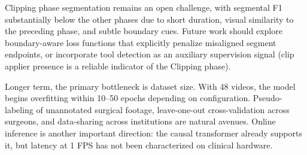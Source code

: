 \documentclass[10pt,twocolumn]{article}
\begin{document}
Clipping phase segmentation remains an open challenge, with segmental F1 substantially below the other phases due to short duration, visual similarity to the preceding phase, and subtle boundary cues. Future work should explore boundary-aware loss functions that explicitly penalize misaligned segment endpoints, or incorporate tool detection as an auxiliary supervision signal (clip applier presence is a reliable indicator of the Clipping phase).

Longer term, the primary bottleneck is dataset size. With 48 videos, the model begins overfitting within 10--50 epochs depending on configuration. Pseudo-labeling of unannotated surgical footage, leave-one-out cross-validation across surgeons, and data-sharing across institutions are natural avenues. Online inference is another important direction: the causal transformer already supports it, but latency at 1 FPS has not been characterized on clinical hardware.
\end{document}

